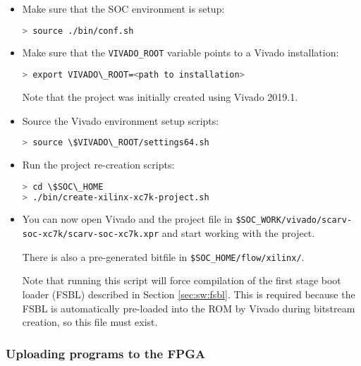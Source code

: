 \begin{itemize}

\item Make sure that the SOC environment is setup:

\begin{lstlisting}[style=block, language=bash]
> source ./bin/conf.sh
\end{lstlisting}

\item Make sure that the {\tt VIVADO\_ROOT} variable points to a Vivado
      installation:

\begin{lstlisting}[style=block, language=bash]
> export VIVADO\_ROOT=<path to installation>
\end{lstlisting}

    Note that the project was initially created using Vivado 2019.1.

\item Source the Vivado environment setup scripts:

\begin{lstlisting}[style=block, language=bash]
> source \$VIVADO\_ROOT/settings64.sh
\end{lstlisting}

\item Run the project re-creation scripts:

\begin{lstlisting}[style=block, language=bash]
> cd \$SOC\_HOME
> ./bin/create-xilinx-xc7k-project.sh
\end{lstlisting}

\item You can now open Vivado and the project file in
  {\tt \$SOC\_WORK/vivado/scarv-soc-xc7k/scarv-soc-xc7k.xpr}
  and start working with the project.

  There is also a pre-generated bitfile in 
  {\tt \$SOC\_HOME/flow/xilinx/}.

  Note that running this script will force compilation of
  the first stage boot loader (FSBL) described in 
  Section \ref{sec:sw:fsbl}.
  This is required because the FSBL is automatically pre-loaded
  into the ROM by Vivado during bitstream creation, so this
  file must exist.


\end{itemize}


\subsubsection{Uploading programs to the FPGA}
\label{sec:hw:fpga:upload}

